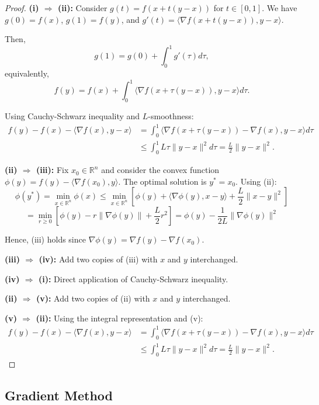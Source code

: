 \begin{proof}
  \textbf{(i) $\Rightarrow$ (ii):} Consider $g(t) = f(x + t(y - x))$ for $t \in [0, 1]$. We have $g(0) = f(x)$, $g(1) = f(y)$, and $g'(t) = \langle\nabla f(x + t(y - x)), y - x\rangle$.
  
  Then,
  \[
    g(1) = g(0) + \int_0^1 g'(\tau) d\tau,
  \]
  equivalently,
  \[
    f(y) = f(x) + \int_0^1 \langle\nabla f(x + \tau(y - x)), y - x\rangle d\tau.
  \]
  
  Using Cauchy-Schwarz inequality and $L$-smoothness:
  \begin{align}
    f(y) - f(x) - \langle\nabla f(x), y - x\rangle &= \int_0^1 \langle\nabla f(x + \tau(y - x)) - \nabla f(x), y - x\rangle d\tau \\
    &\leq \int_0^1 L\tau\|y - x\|^2 d\tau = \frac{L}{2}\|y - x\|^2.
  \end{align}
  
  \textbf{(ii) $\Rightarrow$ (iii):} Fix $x_0 \in \mathbb{R}^n$ and consider the convex function $\phi(y) = f(y) - \langle\nabla f(x_0), y\rangle$. The optimal solution is $y^* = x_0$. Using (ii):
  \[
    \phi(y^*) = \min_{x \in \mathbb{R}^n} \phi(x) \leq \min_{x \in \mathbb{R}^n} \left[\phi(y) + \langle\nabla\phi(y), x - y\rangle + \frac{L}{2}\|x - y\|^2\right]
  \]
  \[
    = \min_{r \geq 0} \left[\phi(y) - r\|\nabla\phi(y)\| + \frac{L}{2}r^2\right] = \phi(y) - \frac{1}{2L}\|\nabla\phi(y)\|^2
  \]
  
  Hence, (iii) holds since $\nabla\phi(y) = \nabla f(y) - \nabla f(x_0)$.
  
  \textbf{(iii) $\Rightarrow$ (iv):} Add two copies of (iii) with $x$ and $y$ interchanged.
  
  \textbf{(iv) $\Rightarrow$ (i):} Direct application of Cauchy-Schwarz inequality.
  
  \textbf{(ii) $\Rightarrow$ (v):} Add two copies of (ii) with $x$ and $y$ interchanged.
  
  \textbf{(v) $\Rightarrow$ (ii):} Using the integral representation and (v):
  \begin{align}
    f(y) - f(x) - \langle\nabla f(x), y - x\rangle &= \int_0^1 \langle\nabla f(x + \tau(y - x)) - \nabla f(x), y - x\rangle d\tau \\
    &\leq \int_0^1 L\tau\|y - x\|^2 d\tau = \frac{L}{2}\|y - x\|^2.
  \end{align}
\end{proof}

\subsection{Gradient Method}

